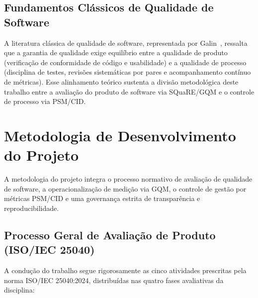\documentclass[journal]{IEEEtran}
\begin{document}
\subsection{Fundamentos Clássicos de Qualidade de Software}
\label{sec:galin}

A literatura clássica de qualidade de software, representada por Galin~\cite{galin2018}, ressalta que a garantia de qualidade exige equilíbrio entre a qualidade de produto (verificação de conformidade de código e usabilidade) e a qualidade de processo (disciplina de testes, revisões sistemáticas por pares e acompanhamento contínuo de métricas). Esse alinhamento teórico sustenta a divisão metodológica deste trabalho entre a avaliação do produto de software via SQuaRE/GQM e o controle de processo via PSM/CID.

\section{Metodologia de Desenvolvimento do Projeto}
\label{sec:metodologia}

A metodologia do projeto integra o processo normativo de avaliação de qualidade de software, a operacionalização de medição via GQM, o controle de gestão por métricas PSM/CID e uma governança estrita de transparência e reproducibilidade.

\subsection{Processo Geral de Avaliação de Produto (ISO/IEC 25040)}
\label{sec:processo_avaliacao}

A condução do trabalho segue rigorosamente as cinco atividades prescritas pela norma ISO/IEC 25040:2024, distribuídas nas quatro fases avaliativas da disciplina:
\end{document}
